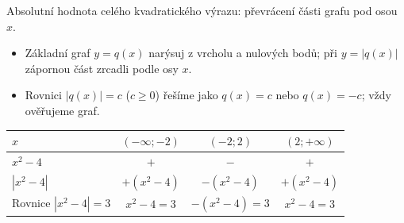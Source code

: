 \documentclass[11pt,a4paper]{article}
\begin{document}
Absolutní hodnota celého kvadratického výrazu: převrácení části grafu pod osou $x$.
\begin{itemize}
\item Základní graf $y=q(x)$ narýsuj z vrcholu a nulových bodů; při $y=|q(x)|$ zápornou část zrcadli podle osy $x$.
\item Rovnici $|q(x)|=c$ ($c\ge0$) řešíme jako $q(x)=c$ nebo $q(x)=-c$; vždy ověřujeme graf.
\end{itemize}
\begin{center}\renewcommand{\arraystretch}{1.26}\small
\begin{tabular}{@{}lccc@{}}\toprule
$x$ & $(-\infty;-2)$ & $(-2;2)$ & $(2;+\infty)$\\\midrule
$x^2-4$ & $+$ & $-$ & $+$\\
$|x^2-4|$ & $+(x^2-4)$ & $-(x^2-4)$ & $+(x^2-4)$\\\midrule
Rovnice $|x^2-4|=3$ & $x^2-4=3$ & $-(x^2-4)=3$ & $x^2-4=3$\\\bottomrule
\end{tabular}
\end{center}
\end{document}
